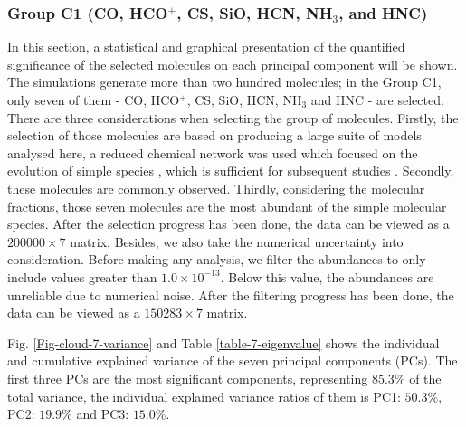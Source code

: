 \documentclass{aa}
\begin{document}
\begin{CJK*}{UTF8}{gbsn}
  
  
\subsubsection{Group C1 (CO, HCO$^+$, CS, SiO, HCN, NH$_3$, and HNC)}
   
  In this section, a statistical and graphical presentation of the quantified significance of the selected molecules on each principal component will be shown. 
  The simulations generate more than two hundred molecules; in the Group C1, only seven of them - 
  CO, HCO$^+$, CS, SiO, HCN, NH$_3$ and HNC - are selected. 
  There are three considerations when selecting the group of molecules.  
  Firstly, the selection of those molecules are based on producing a large suite of models analysed here, a reduced chemical network was used which focused on the evolution of simple species \citep{holdship2017uclchem}, which is sufficient for subsequent studies \citep{schmalzl2014water}.
  Secondly, these molecules are commonly observed. 
  Thirdly, considering the molecular fractions, those seven molecules are the most abundant of the simple molecular species. 
  After the selection progress has been done, the data can be viewed as a $200000\times7$ matrix. 
  Besides, we also take the numerical uncertainty into consideration. 
  Before making any analysis, we filter the abundances to only include values greater than $1.0\times10^{-13}$. 
  Below this value, the abundances are unreliable due to numerical noise. 
  After the filtering progress has been done, the data can be viewed as a $150283\times7$ matrix.  
  
  Fig. \ref{Fig-cloud-7-variance} and Table \ref{table-7-eigenvalue} shows the individual and cumulative explained variance of the seven principal components (PCs). The first three PCs are the most significant components, representing $85.3\%$ of the total variance, the individual explained variance ratios of them is PC1: $50.3\%$, PC2: $19.9\%$ and PC3: $15.0\%$.
  

\end{CJK*}
\end{document}
